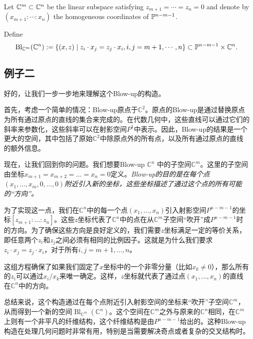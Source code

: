 \begin{exam}\label{exam:blow-up at subspace}
    Let ${\mathbb C}^m\subset {\mathbb C}^n$ be the linear subspace satisfying $z_{m+1}=\cdots=z_n=0$ and denote by $(x_{m+1}:\cdots:x_n)$ the homogeneous coordinates of ${\mathbb P}^{n-m-1}$.

    Define 
    \[
        \operatorname{Bl}_{{\mathbb C}^m}({\mathbb C}^n):=\{(x,z)\mid z_i\cdot x_j=z_j\cdot x_i, i,j=m+1,\cdots,n\}\subset {\mathbb P}^{n-m-1}\times {\mathbb C}^{n}.
    \]
\end{exam}

\subsection{例子二}
好的，让我们一步一步地来理解这个Blow-up的构造。

首先，考虑一个简单的情况：Blow-up原点于$\mathbb{C}^2$。原点的Blow-up是通过替换原点为所有通过原点的直线的集合来完成的。在代数几何中，这些直线可以通过它们的斜率来参数化，这些斜率可以在射影空间$P^1$中表示。因此，Blow-up的结果是一个更大的空间，其中包括了原始$\mathbb{C}^2$中除原点外的所有点，以及所有通过原点的直线的额外信息。

现在，让我们回到你的问题。我们想要Blow-up $\mathbb{C}^n$ 中的子空间$\mathbb{C}^m$。这里的子空间由坐标$x_{m+1} = x_{m+2} = \ldots = x_n = 0$定义。\textit{Blow-up的目的是在每个点$(x_1, \ldots, x_m, 0, \ldots, 0)$附近引入新的坐标，这些坐标描述了通过这个点的所有可能的“方向”。}

为了实现这一点，我们在$\mathbb{C}^n$中的每一个点$(x_1, \ldots, x_n)$引入射影空间$P^{n-m-1}$的坐标$[z_{m+1} : \ldots : z_n]$。这些$z$坐标代表了$\mathbb{C}^n$中的点在从$\mathbb{C}^m$子空间“吹开”成$P^{n-m-1}$时的方向。为了确保这些方向是良好定义的，我们需要$z$坐标满足一定的等价关系，即任意两个$z_i$和$z_j$之间必须有相同的比例因子。这就是为什么我们要求$z_i \cdot x_j = z_j \cdot x_i$，对于所有$i,j = m+1, \ldots, n$。

这组方程确保了如果我们固定了$x$坐标中的一个非零分量（比如$x_k \neq 0$），那么所有的$z_i$可以通过$x_i/x_k$来唯一确定。这样，$z$坐标就代表了通过点$(x_1, \ldots, x_n)$的直线在$\mathbb{C}^n$中的方向。

总结来说，这个构造通过在每个点附近引入射影空间的坐标来“吹开”子空间$\mathbb{C}^m$，从而得到一个新的空间$\operatorname{Bl}_{\mathbb{C}^m}(\mathbb{C}^n)$。这个空间在$\mathbb{C}^m$之外与原来的$\mathbb{C}^n$相同，在$\mathbb{C}^m$上则有一个非平凡的纤维结构，这个纤维结构是由$P^{n-m-1}$给出的。这种Blow-up构造在处理几何问题时非常有用，特别是当需要解决奇点或者复杂的交叉结构时。

